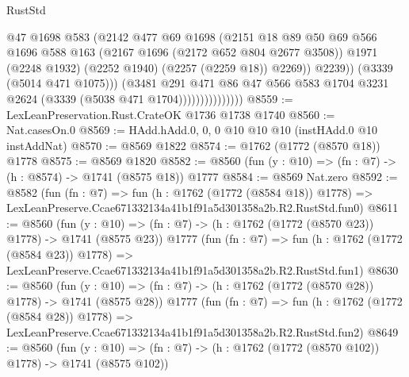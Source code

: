 \begin{lexlean}{RustStd}
\begin{coremodule}
                                  @47
                                  @1698
                                  @583
                                  (@2142
                                    @477
                                    @69
                                    @1698
                                    (@2151
                                      @18
                                      @89
                                      @50
                                      @69
                                      @566
                                      @1696
                                      @588
                                      @163
                                      (@2167 @1696 (@2172 @652 @804 @2677 @3508))
                                      @1971
                                      (@2248 @1932)
                                      (@2252 @1940)
                                      (@2257 (@2259 @18))
                                      @2269))
                                  @2239))
                              (@3339 (@5014 @471 @1075)))
                            (@3481
                              @291
                              @471
                              @86
                              @47
                              @566
                              @583
                              @1704
                              @3231
                              @2624
                              (@3339 (@5038 @471 @1704)))))))))))))))
@8559 := LexLeanPreservation.Rust.CrateOK @1736 @1738 @1740
@8560 := Nat.casesOn.{0}
@8569 := HAdd.hAdd.{0, 0, 0} @10 @10 @10 (instHAdd.{0} @10 instAddNat)
@8570 := @8569 @1822
@8574 := @1762 (@1772 (@8570 @18)) @1778
@8575 := @8569 @1820
@8582 := @8560 (fun (y : @10) => (fn : @7) -> (h : @8574) -> @1741 (@8575 @18)) @1777
@8584 := @8569 Nat.zero
@8592 := @8582
    (fun (fn : @7) =>
    fun (h : @1762 (@1772 (@8584 @18)) @1778) =>
    LexLeanPreserve.Ccae671332134a41b1f91a5d301358a2b.R2.RustStd.fun0)
@8611 := @8560
    (fun (y : @10) => (fn : @7) -> (h : @1762 (@1772 (@8570 @23)) @1778) -> @1741 (@8575 @23))
    @1777
    (fun (fn : @7) =>
    fun (h : @1762 (@1772 (@8584 @23)) @1778) =>
    LexLeanPreserve.Ccae671332134a41b1f91a5d301358a2b.R2.RustStd.fun1)
@8630 := @8560
    (fun (y : @10) => (fn : @7) -> (h : @1762 (@1772 (@8570 @28)) @1778) -> @1741 (@8575 @28))
    @1777
    (fun (fn : @7) =>
    fun (h : @1762 (@1772 (@8584 @28)) @1778) =>
    LexLeanPreserve.Ccae671332134a41b1f91a5d301358a2b.R2.RustStd.fun2)
@8649 := @8560
    (fun (y : @10) => (fn : @7) -> (h : @1762 (@1772 (@8570 @102)) @1778) -> @1741 (@8575 @102))

\end{coremodule}
\end{lexlean}
